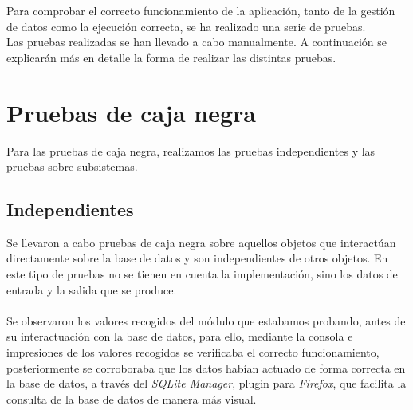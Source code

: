 

Para comprobar el correcto funcionamiento de la aplicación, tanto de la gestión de datos como la ejecución correcta, se ha realizado una serie de pruebas.\\
Las pruebas realizadas se han llevado a cabo manualmente. A continuación se explicarán más en detalle la forma de realizar las distintas pruebas.\\

\section{Pruebas de caja negra}

Para las pruebas de caja negra, realizamos las pruebas independientes y las pruebas sobre subsistemas.

\subsection{Independientes}
Se llevaron a cabo pruebas de caja negra sobre aquellos objetos que interactúan directamente sobre la base de datos y son independientes de otros objetos. En este tipo de pruebas no se tienen en cuenta la implementación, sino los datos de entrada y la salida que se produce.\\\\
Se observaron los valores recogidos del módulo que estabamos probando, antes de su interactuación con la base de datos, para ello, mediante la consola e impresiones de los valores recogidos se verificaba el correcto funcionamiento, posteriormente se corroboraba que los datos habían actuado de forma correcta en la base de datos, a través del \textit{SQLite Manager}, plugin para \textit{Firefox}, que facilita la consulta de la base de datos de manera más visual.

